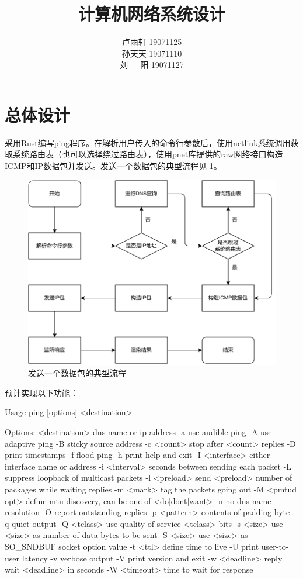 \documentclass{ctexart}
\title{计算机网络系统设计}
\author{卢雨轩 19071125 \\ 孙天天 19071110 \\ 刘~~~阳 19071127}
\begin{document}
 

\maketitle

\section{总体设计}
采用Rust编写ping程序。在解析用户传入的命令行参数后，使用netlink系统调用获取系统路由表（也可以选择绕过路由表），使用pnet库提供的raw网络接口构造ICMP和IP数据包并发送。发送一个数据包的典型流程见 \cref{fig:ping-flow}。

\begin{figure}[htp]
    \centering
    \includegraphics[width=.8\linewidth]{design.drawio.pdf}
    \caption{发送一个数据包的典型流程}
    \label{fig:ping-flow}
\end{figure}

预计实现以下功能：
\iffalse

Usage
  ping [options] <destination>

Options:
  <destination>      dns name or ip address
  -a                 use audible ping
  -A                 use adaptive ping
  -B                 sticky source address
  -c <count>         stop after <count> replies
  -D                 print timestamps
  -f                 flood ping
  -h                 print help and exit
  -I <interface>     either interface name or address
  -i <interval>      seconds between sending each packet
  -L                 suppress loopback of multicast packets
  -l <preload>       send <preload> number of packages while waiting replies
  -m <mark>          tag the packets going out
  -M <pmtud opt>     define mtu discovery, can be one of <do|dont|want>
  -n                 no dns name resolution
  -O                 report outstanding replies
  -p <pattern>       contents of padding byte
  -q                 quiet output
  -Q <tclass>        use quality of service <tclass> bits
  -s <size>          use <size> as number of data bytes to be sent
  -S <size>          use <size> as SO_SNDBUF socket option value
  -t <ttl>           define time to live
  -U                 print user-to-user latency
  -v                 verbose output
  -V                 print version and exit
  -w <deadline>      reply wait <deadline> in seconds
  -W <timeout>       time to wait for response
\end{document}
